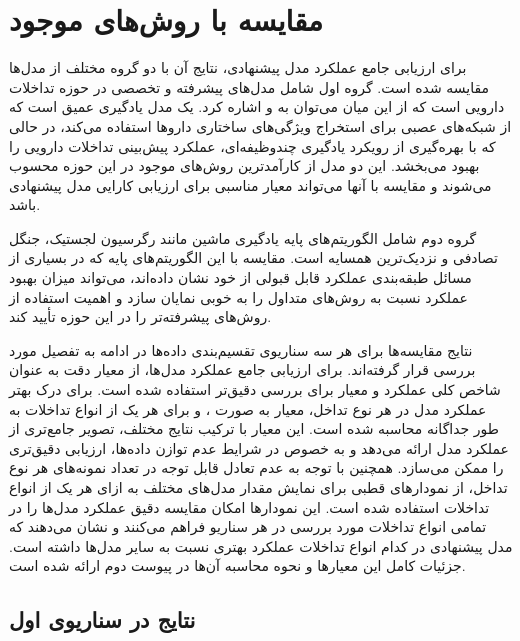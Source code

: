 \section{مقایسه با روش‌های موجود}

برای ارزیابی جامع عملکرد مدل پیشنهادی، نتایج آن با دو گروه مختلف از مدل‌ها مقایسه شده است. گروه اول شامل مدل‌های پیشرفته و تخصصی در حوزه تداخلات دارویی است که از این میان می‌توان به  \cite{ref_ryu2018} و  \cite{ref_deng2020} اشاره کرد.  یک مدل یادگیری عمیق است که از شبکه‌های عصبی برای استخراج ویژگی‌های ساختاری داروها استفاده می‌کند، در حالی که  با بهره‌گیری از رویکرد یادگیری چندوظیفه‌ای، عملکرد پیش‌بینی تداخلات دارویی را بهبود می‌بخشد. این دو مدل از کارآمدترین روش‌های موجود در این حوزه محسوب می‌شوند و مقایسه با آنها می‌تواند معیار مناسبی برای ارزیابی کارایی مدل پیشنهادی باشد.

گروه دوم شامل الگوریتم‌های پایه یادگیری ماشین مانند رگرسیون لجستیک، جنگل تصادفی و نزدیک‌ترین همسایه است. مقایسه با این الگوریتم‌های پایه که در بسیاری از مسائل طبقه‌بندی عملکرد قابل قبولی از خود نشان داده‌اند، می‌تواند میزان بهبود عملکرد نسبت به روش‌های متداول را به خوبی نمایان سازد و اهمیت استفاده از روش‌های پیشرفته‌تر را در این حوزه تأیید کند.

نتایج مقایسه‌ها برای هر سه سناریوی تقسیم‌بندی داده‌ها در ادامه به تفصیل مورد بررسی قرار گرفته‌اند. برای ارزیابی جامع عملکرد مدل‌ها، از معیار دقت به عنوان شاخص کلی عملکرد و معیار  برای بررسی دقیق‌تر استفاده شده است. برای درک بهتر عملکرد مدل در هر نوع تداخل، معیار  به صورت ،  و  برای هر یک از انواع تداخلات به طور جداگانه محاسبه شده است. این معیار با ترکیب نتایج مختلف، تصویر جامع‌تری از عملکرد مدل ارائه می‌دهد و به خصوص در شرایط عدم توازن داده‌ها، ارزیابی دقیق‌تری را ممکن می‌سازد. همچنین با توجه به عدم تعادل قابل توجه در تعداد نمونه‌های هر نوع تداخل، از نمودارهای قطبی برای نمایش مقدار  مدل‌های مختلف به ازای هر یک از انواع تداخلات استفاده شده است. این نمودارها امکان مقایسه دقیق عملکرد مدل‌ها را در تمامی انواع تداخلات مورد بررسی در هر سناریو فراهم می‌کنند و نشان می‌دهند که مدل پیشنهادی در کدام انواع تداخلات عملکرد بهتری نسبت به سایر مدل‌ها داشته است. جزئیات کامل این معیارها و نحوه محاسبه آن‌ها در پیوست دوم ارائه شده است.

\subsection{نتایج در سناریوی اول}

